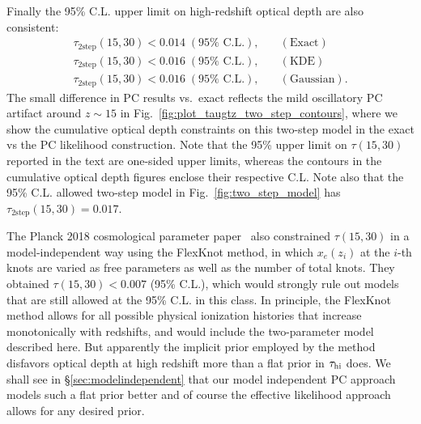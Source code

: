 \documentclass[prd,twocolumn,amsmath,amssymb,floatfix,superscriptaddress,nofootinbib]{revtex4-1}
\begin{document}
Finally the 95\% C.L. upper limit on high-redshift optical depth are also consistent:
%
\begin{align}
\tau_{2\text{step}}(15, 30) < 0.014\; (95\% \text{ C.L.}), & \quad (\text{Exact}) \nonumber\\
\tau_{2\text{step}}(15, 30) < 0.016\; (95\% \text{ C.L.}), & \quad (\text{KDE}) \nonumber\\
\tau_{2\text{step}}(15, 30) < 0.016\; (95\% \text{ C.L.}), & \quad (\text{Gaussian}).
\label{eq:2stepbound}
\end{align}
%
The small difference in PC results vs.~exact reflects the mild oscillatory PC artifact around $z\sim 15$ in Fig.~\ref{fig:plot_taugtz_two_step_contours}, where we show the cumulative optical depth constraints on this two-step model in the exact vs the PC likelihood construction. Note that the 95\% upper limit on $\tau(15, 30)$ reported in the text are one-sided upper limits, whereas the contours in the cumulative optical depth figures enclose their respective C.L.
Note also that the 95\% C.L. allowed two-step model in 
Fig.~\ref{fig:two_step_model} has
$\tau_{2\text{step}}(15,30)= 0.017$.

The Planck 2018 cosmological parameter paper~\cite{Aghanim:2018eyx} also constrained $\tau(15, 30)$ in a model-independent way using the FlexKnot method, in which $x_e(z_i)$ at the $i$-th knots are varied as free parameters as well as the number of total knots. They obtained $\tau(15, 30) < 0.007$ (95\% C.L.), which would strongly rule out models that are still allowed at the 95\% C.L. in this class. 
In principle, the FlexKnot method allows for all possible physical ionization histories that increase monotonically with redshifts, and would include the two-parameter model described here. But apparently the implicit prior employed by the method disfavors optical depth at high redshift more than a flat prior in 
$\tau_{\rm hi}$ does.  We shall see in \S \ref{sec:modelindependent} that our model independent PC approach models such a flat prior better and of course the effective likelihood approach allows for any desired prior.
\end{document}
